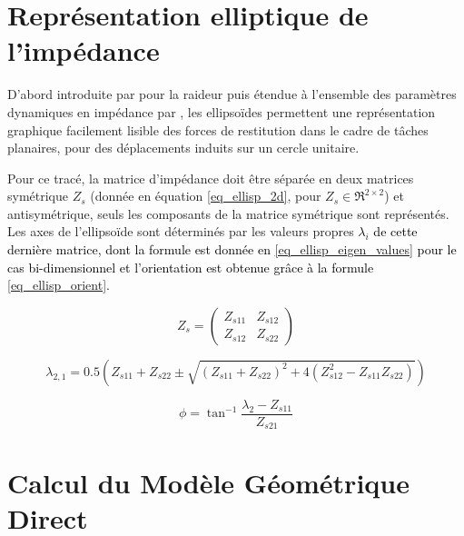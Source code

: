 \begin{appendices}
	
	\chapter{Représentation elliptique de l'impédance} \label{app_imp_graph}
	
	D'abord introduite par \textcite{mussa-ivaldi_neural_1985} pour la raideur puis étendue à l'ensemble des paramètres dynamiques en impédance par \textcite{dolan_dynamic_1993}, les ellipsoïdes permettent une représentation graphique facilement lisible des forces de restitution dans le cadre de tâches planaires, pour des déplacements induits sur un cercle unitaire.
	
	Pour ce tracé, la matrice d'impédance doit être séparée en deux matrices symétrique $Z_s$ (donnée en équation \cref{eq_ellisp_2d}, pour $Z_s\in \Re^{2\times2}$) et antisymétrique, seuls les composants de la matrice symétrique sont représentés. Les axes de l'ellipsoïde sont déterminés par les valeurs propres \textcolor{black}{$\lambda_i$ de cette dernière matrice, dont la formule est donnée en \cref{eq_ellisp_eigen_values} pour le cas bi-dimensionnel et l'orientation est obtenue grâce à la formule \cref{eq_ellisp_orient}.}
	
	\tikzexternalenable
	
	
	\begin{equation} \label{eq_ellisp_2d}
		Z_s = \begin{pmatrix}
			Z_{s11} & Z_{s12}\\%
			Z_{s12} & Z_{s22}%
		\end{pmatrix}
	\end{equation}
	
	\begin{equation} \label{eq_ellisp_eigen_values}
		\lambda_{2,1} = 0.5\left( Z_{s11} + Z_{s22} \pm \sqrt{(Z_{s11} + Z_{s22})^2+ 4(Z_{s12}^2 -Z_{s11}Z_{s22})} \right)
	\end{equation}
	
	\begin{equation} \label{eq_ellisp_orient}
		\phi=\tan^{-1}\frac{\lambda_2-Z_{s11}}{Z_{s21}}
	\end{equation}
	
	\chapter{Calcul du Modèle Géométrique Direct} \label{app_direct_kinem}
	

\end{appendices}
